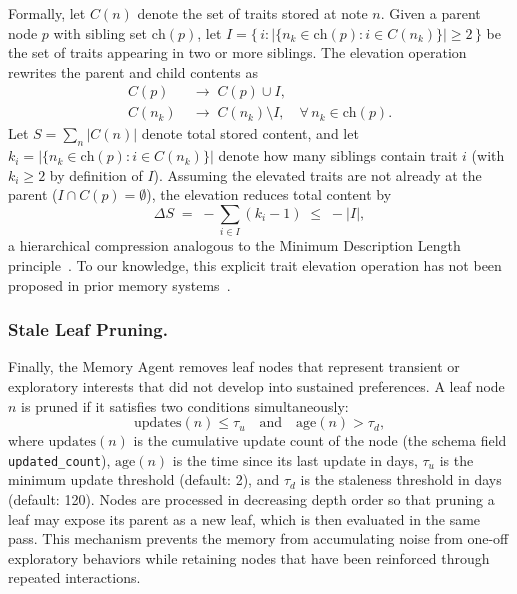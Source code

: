 \documentclass[sigconf,review,anonymous]{acmart}
\begin{document}
Formally, let \(C(n)\) denote the set of traits stored at note \(n\). Given a parent node \(p\) with sibling set \(\mathrm{ch}(p)\), let \(I = \{\,i : |\{n_k \in \mathrm{ch}(p) : i \in C(n_k)\}| \geq 2\,\}\) be the set of traits appearing in two or more siblings. The elevation operation rewrites the parent and child contents as
\begin{equation}
\label{eq:elevation}
\begin{aligned}
C(p) &\;\to\; C(p) \cup I, \\
C(n_k) &\;\to\; C(n_k) \setminus I, \quad \forall\, n_k \in \mathrm{ch}(p).
\end{aligned}
\end{equation}
Let \(S = \sum_n |C(n)|\) denote total stored content, and let \(k_i = |\{n_k \in \mathrm{ch}(p) : i \in C(n_k)\}|\) denote how many siblings contain trait \(i\) (with \(k_i \geq 2\) by definition of \(I\)). Assuming the elevated traits are not already at the parent (\(I \cap C(p) = \emptyset\)), the elevation reduces total content by
\begin{equation}
\label{eq:elevation-savings}
\Delta S \;=\; -\!\sum_{i \in I}(k_i - 1) \;\leq\; -|I|,
\end{equation}
a hierarchical compression analogous to the Minimum Description Length principle~\cite{mdl}. To our knowledge, this explicit trait elevation operation has not been proposed in prior memory systems~\cite{mem0,amem,personamem-v2,emem}.

\subsubsection{Stale Leaf Pruning.}
Finally, the Memory Agent removes leaf nodes that represent transient or exploratory interests that did not develop into sustained preferences. A leaf node $n$ is pruned if it satisfies two conditions simultaneously:
\begin{equation}
\label{eq:pruning}
    \mathrm{updates}(n) \leq \tau_u \quad \text{and} \quad \mathrm{age}(n) > \tau_d,
\end{equation}
where \(\mathrm{updates}(n)\) is the cumulative update count of the node (the schema field \texttt{updated\_count}), \(\mathrm{age}(n)\) is the time since its last update in days, \(\tau_u\) is the minimum update threshold (default: 2), and \(\tau_d\) is the staleness threshold in days (default: 120). Nodes are processed in decreasing depth order so that pruning a leaf may expose its parent as a new leaf, which is then evaluated in the same pass. This mechanism prevents the memory from accumulating noise from one-off exploratory behaviors while retaining nodes that have been reinforced through repeated interactions.
\end{document}
